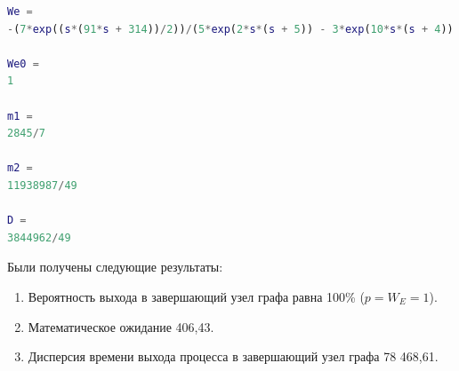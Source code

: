 \begin{lstlisting}[language={matlab}, caption={Результат}, basicstyle=\ttfamily]
We =
-(7*exp((s*(91*s + 314))/2))/(5*exp(2*s*(s + 5)) - 3*exp(10*s*(s + 4)) + 30*exp(2*s*(4*s + 15)) - exp((3*s*(15*s + 52))/2) + 10*exp((s*(41*s + 136))/2) + 2*exp((s*(91*s + 314))/2) - 50)
 
We0 =
1
 
m1 =
2845/7
 
m2 =
11938987/49
 
D =
3844962/49
\end{lstlisting}
Были получены следующие результаты:
\begin{enumerate}
\item Вероятность выхода в завершающий узел графа равна 100\% ($p=W_E=1$).
\item Математическое ожидание 406,43.
\item Дисперсия времени выхода процесса в завершающий узел графа 78 468,61.
\end{enumerate}
